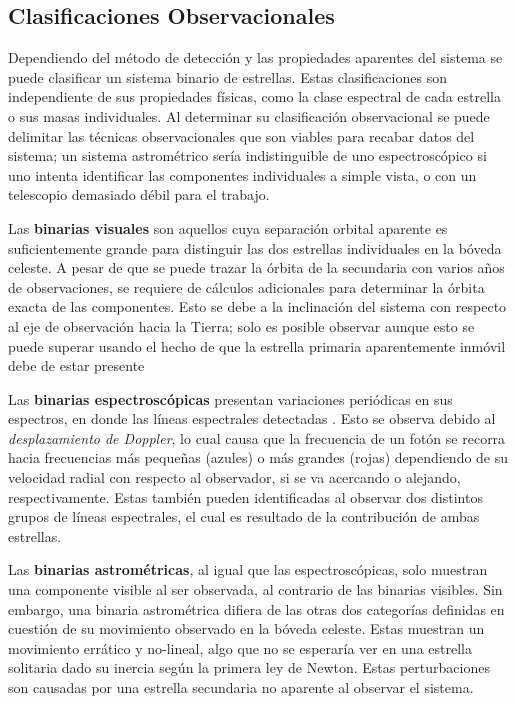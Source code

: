 \subsection{Clasificaciones Observacionales}

Dependiendo del método de detección y las propiedades aparentes del sistema se
puede clasificar un sistema binario de estrellas. Estas clasificaciones son
independiente de sus propiedades físicas, como la clase espectral de cada
estrella o sus masas individuales. Al determinar su clasificación observacional
se puede delimitar las técnicas observacionales que son viables para recabar
datos del sistema; un sistema astrométrico sería indistinguible de uno
espectroscópico si uno intenta identificar las componentes individuales a simple
vista, o con un telescopio demasiado débil para el trabajo.

Las \textbf{binarias visuales} son aquellos cuya separación orbital aparente es
suficientemente grande para distinguir las dos estrellas individuales en la
bóveda celeste. A pesar de que se puede trazar la órbita de la secundaria con
varios años de observaciones, se requiere de cálculos adicionales para
determinar la órbita exacta de las componentes. Esto se debe a la inclinación
del sistema con respecto al eje de observación hacia la Tierra; solo es posible
observar  aunque esto se puede superar usando el hecho de que la estrella primaria
aparentemente inmóvil debe de estar presente  

Las \textbf{binarias espectroscópicas} presentan variaciones periódicas en sus
espectros, en donde las líneas espectrales detectadas 
. Esto se observa
debido al \textit{desplazamiento de Doppler}, lo cual causa que la frecuencia de
un fotón se recorra hacia frecuencias más pequeñas (azules) o más grandes
(rojas) dependiendo de su velocidad radial con respecto al observador, si se va
acercando o alejando, respectivamente. Estas también pueden identificadas al
observar dos distintos grupos de líneas espectrales, el cual es resultado de la
contribución de ambas estrellas.

Las \textbf{binarias astrométricas}, al igual que las espectroscópicas, solo
muestran una componente visible al ser observada, al contrario de las binarias
visibles. Sin embargo, una binaria astrométrica difiera de las otras dos
categorías definidas en cuestión de su movimiento observado en la bóveda
celeste. Estas muestran un movimiento errático y no-lineal, algo que no se
esperaría ver en una estrella solitaria dado su inercia según la primera ley de
Newton. Estas perturbaciones son causadas por una estrella secundaria no
aparente al observar el sistema. 

